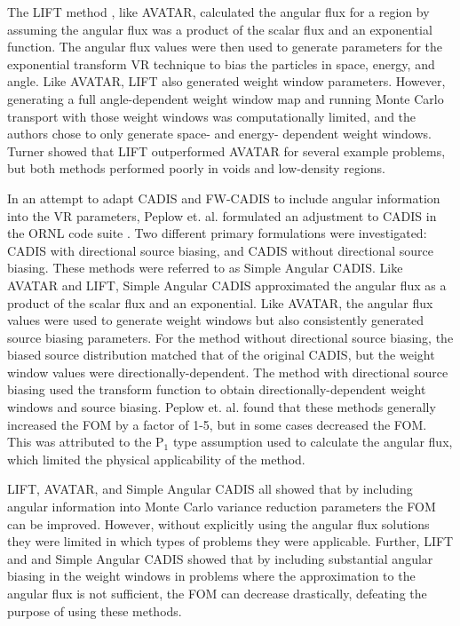 The LIFT method \cite{turner_automatic_1997, turner_automatic_1997-1}, like
AVATAR, calculated the angular flux for a region by assuming the angular flux
was a product of the scalar flux and an exponential function. The angular flux
values were then used to generate parameters for the exponential transform VR
technique to bias the particles in space, energy, and angle. Like AVATAR, LIFT
also generated weight window parameters. However, generating a full
angle-dependent weight window map and running Monte Carlo transport with those
weight windows was computationally limited, and the authors chose to only
generate space- and energy- dependent weight windows. Turner showed that LIFT
outperformed AVATAR for several example problems, but both methods performed
poorly in voids and low-density regions.

In an attempt to adapt CADIS and FW-CADIS to include angular information into
the VR parameters, Peplow et. al. formulated an adjustment to CADIS in the ORNL
code suite \cite{peplow_consistent_2012}. Two different primary
formulations were investigated:
CADIS with directional source biasing, and CADIS without directional source
biasing. These methods were referred to as Simple Angular CADIS. Like AVATAR and
LIFT, Simple Angular CADIS approximated the angular flux as a product of the
scalar flux and an exponential. Like AVATAR, the angular flux values
were used to
generate weight windows but also consistently generated source
biasing parameters. For the method without
directional source biasing, the biased source distribution matched that of the
original CADIS, but the weight window values were directionally-dependent. The
method with directional source biasing used the transform function to obtain
directionally-dependent weight windows and source biasing. Peplow et. al. found
that these methods generally increased the FOM by a factor of 1-5, but in some
cases decreased the FOM. This was attributed to the P$_1$ type assumption used
to calculate the angular flux, which limited the physical applicability of the
method.

LIFT, AVATAR, and Simple Angular CADIS all showed that by including angular
information into Monte Carlo variance reduction parameters the FOM can be
improved. However, without explicitly using the angular flux solutions they were
limited in which types of problems they were applicable. Further, LIFT and and
Simple Angular CADIS showed that by including substantial angular biasing in the
weight windows in problems where the approximation to the angular flux is not
sufficient, the FOM can decrease drastically, defeating the purpose of using
these methods.

